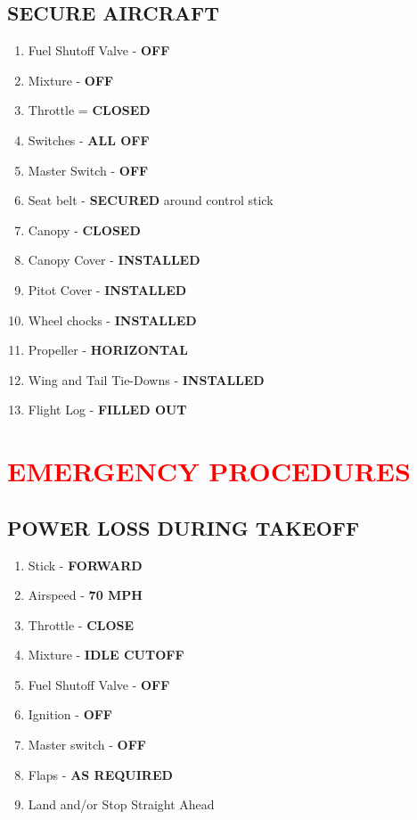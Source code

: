\documentclass[14pt,letterpaper, twoside]{extarticle}
\begin{document}
\subsection{SECURE AIRCRAFT}

\begin{enumerate}
\item Fuel Shutoff Valve - \textbf{OFF}
\item Mixture  - \textbf{OFF}
\item Throttle = \textbf{CLOSED}
\item Switches - \textbf{ALL OFF}
\item Master Switch - \textbf{OFF}
\item Seat belt - \textbf{SECURED} around control stick
\item Canopy - \textbf{CLOSED}
\item Canopy Cover - \textbf{INSTALLED}
\item Pitot Cover - \textbf{INSTALLED}
\item Wheel chocks - \textbf{INSTALLED}
\item Propeller - \textbf{HORIZONTAL}
\item Wing and Tail Tie-Downs - \textbf{INSTALLED}
\item Flight Log - \textbf{FILLED OUT}
\end{enumerate}
	
	
	
	\clearpage
\section{\textcolor{red}{EMERGENCY PROCEDURES}}	

\subsection{POWER LOSS DURING TAKEOFF}

\begin{enumerate}
\item Stick - \textbf{FORWARD}
\item Airspeed - \textbf{70 MPH}
\item Throttle - \textbf{CLOSE}
\item Mixture - \textbf{IDLE CUTOFF}
\item Fuel Shutoff Valve - \textbf{OFF}
\item Ignition - \textbf{OFF}
\item Master switch - \textbf{OFF}
\item Flaps - \textbf{AS REQUIRED}
\item Land and/or Stop Straight Ahead 
\end{enumerate}
	
\end{document}
